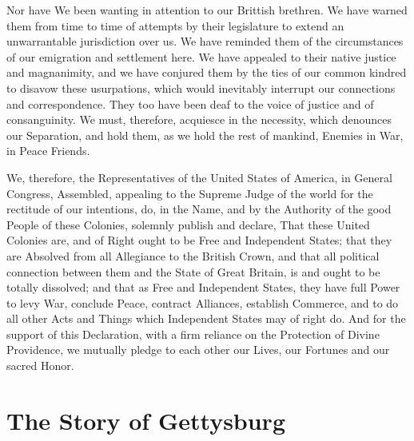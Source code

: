 \documentclass{article}
\begin{document}
Nor have We been wanting in attention to our Brittish brethren.
We have warned them from time to time of attempts by their
legislature to extend an unwarrantable jurisdiction over us.
We have reminded them of the circumstances of our emigration and
settlement here.  We have appealed to their native justice
and magnanimity, and we have conjured them by the ties of our
common kindred to disavow these usurpations, which would inevitably
interrupt our connections and correspondence.  They too have been
deaf to the voice of justice and of consanguinity.  We must, therefore,
acquiesce in the necessity, which denounces our Separation, and hold them,
as we hold the rest of mankind, Enemies in War, in Peace Friends.

We, therefore, the Representatives of the United States of America,
in General Congress, Assembled, appealing to the Supreme Judge of
the world for the rectitude of our intentions, do, in the Name,
and by the Authority of the good People of these Colonies,
solemnly publish and declare, That these United Colonies are,
and of Right ought to be Free and Independent States;
that they are Absolved from all Allegiance to the British Crown,
and that all political connection between them and the State
of Great Britain, is and ought to be totally dissolved;
and that as Free and Independent States, they have full Power to
levy War, conclude Peace, contract Alliances, establish Commerce,
and to do all other Acts and Things which Independent States may
of right do.  And for the support of this Declaration, with a firm
reliance on the Protection of Divine Providence, we mutually pledge
to each other our Lives, our Fortunes and our sacred Honor.

\section{The Story of Gettysburg}
\end{document}
